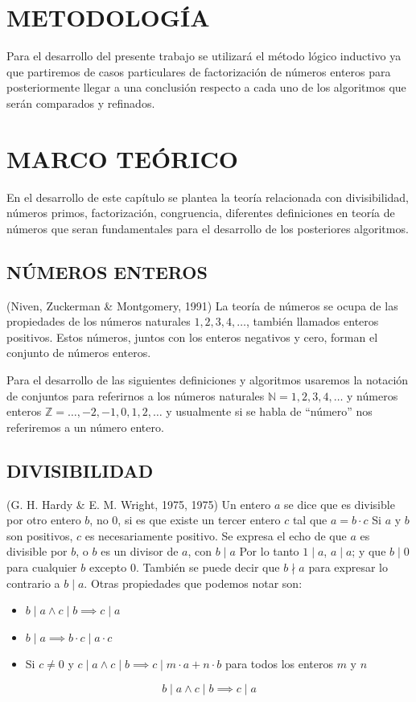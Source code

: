 \documentclass[12pt,letterpaper]{book}
\begin{document}
    
    \chapter{METODOLOGÍA}
    Para el desarrollo del presente trabajo se utilizará el método lógico inductivo ya que partiremos de casos particulares de factorización de números enteros para posteriormente llegar a una conclusión respecto a cada uno de los algoritmos que serán comparados y refinados.
    
    \chapter{MARCO TEÓRICO}
    En el desarrollo de este capítulo se plantea la teoría relacionada con divisibilidad, números primos, factorización, congruencia, diferentes definiciones en teoría de números que seran fundamentales para el desarrollo de los posteriores algoritmos.
    
    \section{NÚMEROS ENTEROS}
    (Niven, Zuckerman \& Montgomery, 1991) La teoría de números se ocupa de las propiedades de los números naturales $1, 2, 3, 4, \dots$, también llamados enteros positivos. Estos números, juntos con los enteros negativos y cero, forman el conjunto de números enteros.

    Para el desarrollo de las siguientes definiciones y algoritmos usaremos la notación de conjuntos para referirnos a los números naturales $ \mathbb{N} = {1, 2, 3,4, \dots}$ y números enteros $ \mathbb{Z} = \dots, -2, -1, 0, 1, 2, \dots$ y usualmente si se habla de “número” nos referiremos a un número entero.

    \section{DIVISIBILIDAD}
    (G. H. Hardy \& E. M. Wright, 1975, 1975) Un entero $a$ se dice que es divisible por otro entero $b$, no $0$, si es que existe un tercer entero $c$ tal que $a=b\cdot c$
    Si $a$ y $b$ son positivos, $c$ es necesariamente positivo. Se expresa el echo de que $a$ es divisible por $b$, o $b$ es un divisor de $a$, con $b \mid a$
    Por lo tanto $1 \mid a$, $a \mid a$; y que $b \mid 0$ para cualquier $b$ excepto 0. También se puede decir que $b \nmid a$ para expresar lo contrario a $b \mid a$.
    Otras propiedades que podemos notar son:
    \begin{itemize}
        \item{$b \mid a \land c \mid b \implies c \mid a$}
        \item{$b \mid a \implies b\cdot c \mid a\cdot c$}
        \item{Si $c\not = 0$ y $c \mid a \land c \mid b \implies c\mid m\cdot a + n\cdot b$ para todos los enteros $m$ y $n$ }
    \end{itemize}
    \[
        b \mid a \land c \mid b \implies c \mid a
    \]
\end{document}

